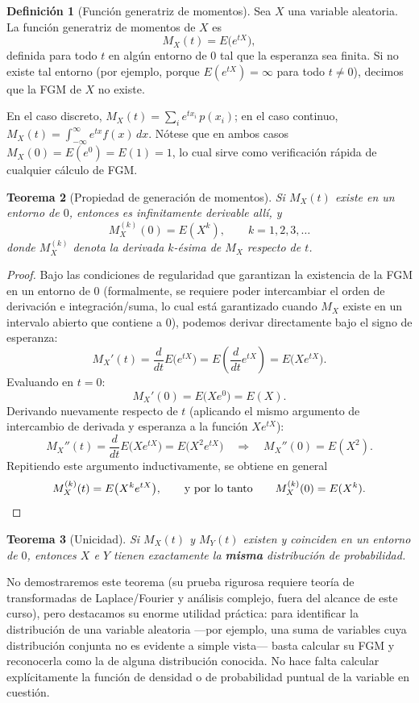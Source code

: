 \documentclass[11pt,a4paper]{article}
\theoremstyle{plain}
\newtheorem{teorema}{Teorema}[section]
\theoremstyle{definition}
\newtheorem{definicion}[teorema]{Definición}
\theoremstyle{remark}
\begin{document}
\begin{definicion}[Función generatriz de momentos]
Sea $X$ una variable aleatoria. La función generatriz de momentos de $X$ es
\[
M_X(t) = E\big(e^{tX}\big),
\]
definida para todo $t$ en algún entorno de $0$ tal que la esperanza sea finita. Si no existe tal entorno (por ejemplo, porque $E(e^{tX})=\infty$ para todo $t\neq0$), decimos que la FGM de $X$ no existe.
\end{definicion}

En el caso discreto, $M_X(t)=\sum_i e^{tx_i}\,p(x_i)$; en el caso continuo, $M_X(t)=\int_{-\infty}^\infty e^{tx}f(x)\,dx$. Nótese que en ambos casos $M_X(0)=E(e^{0})=E(1)=1$, lo cual sirve como verificación rápida de cualquier cálculo de FGM.

\begin{teorema}[Propiedad de generación de momentos]
Si $M_X(t)$ existe en un entorno de $0$, entonces es infinitamente derivable allí, y
\[
M_X^{(k)}(0) = E(X^k), \qquad k=1,2,3,\dots
\]
donde $M_X^{(k)}$ denota la derivada $k$-ésima de $M_X$ respecto de $t$.
\end{teorema}

\begin{proof}
Bajo las condiciones de regularidad que garantizan la existencia de la FGM en un entorno de $0$ (formalmente, se requiere poder intercambiar el orden de derivación e integración/suma, lo cual está garantizado cuando $M_X$ existe en un intervalo abierto que contiene a $0$), podemos derivar directamente bajo el signo de esperanza:
\[
M_X'(t) = \frac{d}{dt}E\big(e^{tX}\big) = E\left(\frac{d}{dt}e^{tX}\right) = E\big(Xe^{tX}\big).
\]
Evaluando en $t=0$:
\[
M_X'(0) = E\big(Xe^{0}\big) = E(X).
\]
Derivando nuevamente respecto de $t$ (aplicando el mismo argumento de intercambio de derivada y esperanza a la función $Xe^{tX}$):
\[
M_X''(t) = \frac{d}{dt}E\big(Xe^{tX}\big) = E\big(X^2 e^{tX}\big) \quad\Longrightarrow\quad M_X''(0) = E(X^2).
\]
Repitiendo este argumento inductivamente, se obtiene en general
\[
M_X^{(k)}(t) = E\big(X^k e^{tX}\big), \qquad\text{y por lo tanto}\qquad M_X^{(k)}(0) = E(X^k). \qedhere
\]
\end{proof}

\begin{teorema}[Unicidad]
Si $M_X(t)$ y $M_Y(t)$ existen y coinciden en un entorno de $0$, entonces $X$ e $Y$ tienen exactamente la \textbf{misma} distribución de probabilidad.
\end{teorema}

No demostraremos este teorema (su prueba rigurosa requiere teoría de transformadas de Laplace/Fourier y análisis complejo, fuera del alcance de este curso), pero destacamos su enorme utilidad práctica: para identificar la distribución de una variable aleatoria —por ejemplo, una suma de variables cuya distribución conjunta no es evidente a simple vista— basta calcular su FGM y reconocerla como la de alguna distribución conocida. No hace falta calcular explícitamente la función de densidad o de probabilidad puntual de la variable en cuestión.
\end{document}
